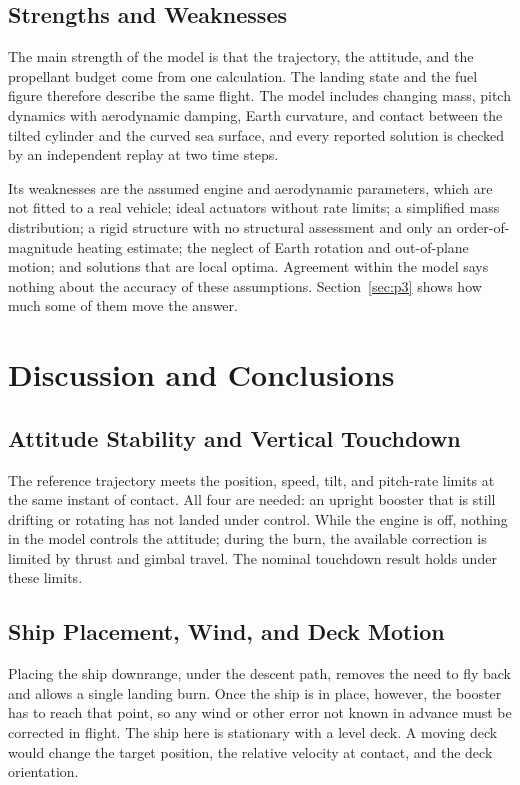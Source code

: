 \documentclass[12pt,a4paper]{article}
\begin{document}
\subsection{Strengths and Weaknesses}
The main strength of the model is that the trajectory, the attitude, and the propellant budget come from one calculation. The landing state and the fuel figure therefore describe the same flight. The model includes changing mass, pitch dynamics with aerodynamic damping, Earth curvature, and contact between the tilted cylinder and the curved sea surface, and every reported solution is checked by an independent replay at two time steps.

Its weaknesses are the assumed engine and aerodynamic parameters, which are not fitted to a real vehicle; ideal actuators without rate limits; a simplified mass distribution; a rigid structure with no structural assessment and only an order-of-magnitude heating estimate; the neglect of Earth rotation and out-of-plane motion; and solutions that are local optima. Agreement within the model says nothing about the accuracy of these assumptions. Section~\ref{sec:p3} shows how much some of them move the answer.
\section{Discussion and Conclusions}
\subsection{Attitude Stability and Vertical Touchdown}
The reference trajectory meets the position, speed, tilt, and pitch-rate limits at the same instant of contact. All four are needed: an upright booster that is still drifting or rotating has not landed under control. While the engine is off, nothing in the model controls the attitude; during the burn, the available correction is limited by thrust and gimbal travel. The nominal touchdown result holds under these limits.

\subsection{Ship Placement, Wind, and Deck Motion}
Placing the ship downrange, under the descent path, removes the need to fly back and allows a single landing burn. Once the ship is in place, however, the booster has to reach that point, so any wind or other error not known in advance must be corrected in flight. The ship here is stationary with a level deck. A moving deck would change the target position, the relative velocity at contact, and the deck orientation.
\end{document}
